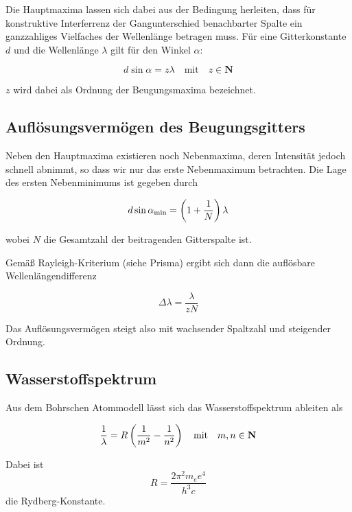 \documentclass[a4paper,german,12pt,smallheadings]{scrartcl}
\begin{document}
Die Hauptmaxima lassen sich dabei aus der Bedingung herleiten, dass für
konstruktive Interferrenz der Gangunterschied benachbarter Spalte ein
ganzzahliges Vielfaches der Wellenlänge betragen muss. Für eine Gitterkonstante
$d$ und die Wellenlänge $\lambda$ gilt für den Winkel $\alpha$:

\begin{equation}
  d \sin \alpha = z \lambda \quad \text{mit} \quad z \in \mathbf{N}
  \label{eq:1}
\end{equation}

$z$ wird dabei als Ordnung der Beugungsmaxima bezeichnet.

\subsection{Auflösungsvermögen des Beugungsgitters}

Neben den Hauptmaxima existieren noch Nebenmaxima, deren Intensität jedoch
schnell abnimmt, so dass wir nur das erste Nebenmaximum betrachten. Die Lage
des ersten Nebenminimums ist gegeben durch

\begin{equation}
  d \sin \alpha_\text{min} = \del{1 + \frac{1}{N}} \lambda
\end{equation}

wobei $N$ die Gesamtzahl der beitragenden Gitterspalte ist.

Gemäß Rayleigh-Kriterium (siehe Prisma) ergibt sich dann die auflösbare
Wellenlängendifferenz

\begin{equation}
  \Delta \lambda = \frac{\lambda}{z N}
\end{equation}

Das Auflösungsvermögen steigt also mit wachsender Spaltzahl und steigender Ordnung.

\subsection{Wasserstoffspektrum}

Aus dem Bohrschen Atommodell lässt sich das Wasserstoffspektrum ableiten als

\begin{equation}
  \frac{1}{\lambda} = R \del{ \frac{1}{m^2} - \frac{1}{n^2}}
  \quad \text{mit} \quad m,n \in \mathbf{N}
\end{equation}

Dabei ist
\begin{equation}
  R = \frac{2 \pi^2 m_e e^4}{h^3 c}
\end{equation}
die Rydberg-Konstante.
\end{document}
